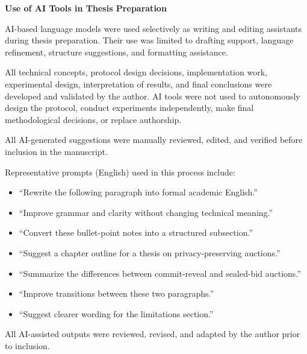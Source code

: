 \documentclass[final,twoside]{vutinfth}
\begin{document}
\begin{aitools}
\textbf{Use of AI Tools in Thesis Preparation}

AI-based language models were used selectively as writing and editing assistants
during thesis preparation.
Their use was limited to drafting support, language refinement, structure
suggestions, and formatting assistance.

All technical concepts, protocol design decisions, implementation work,
experimental design, interpretation of results, and final conclusions were
developed and validated by the author.
AI tools were not used to autonomously design the protocol, conduct
experiments independently, make final methodological decisions, or replace
authorship.

All AI-generated suggestions were manually reviewed, edited, and verified
before inclusion in the manuscript.

Representative prompts (English) used in this process include:
\begin{itemize}
\item ``Rewrite the following paragraph into formal academic English.''
\item ``Improve grammar and clarity without changing technical meaning.''
\item ``Convert these bullet-point notes into a structured subsection.''
\item ``Suggest a chapter outline for a thesis on privacy-preserving auctions.''
\item ``Summarize the differences between commit-reveal and sealed-bid auctions.''
\item ``Improve transitions between these two paragraphs.''
\item ``Suggest clearer wording for the limitations section.''
\end{itemize}

All AI-assisted outputs were reviewed, revised, and adapted by the author
prior to inclusion.
\end{aitools}

\listoffigures
\cleardoublepage
\listoftables



\end{document}
